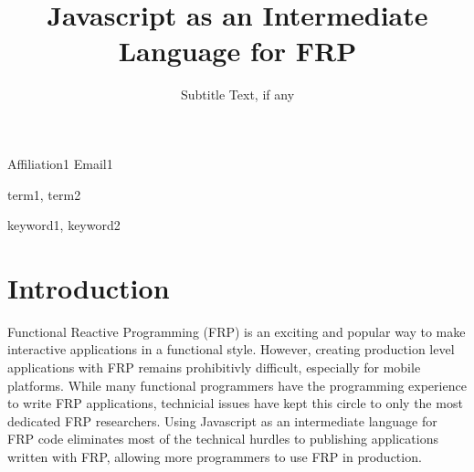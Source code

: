 \documentclass{sigplanconf}
\begin{document}
\setlength{\pdfpageheight}{\paperheight}
\setlength{\pdfpagewidth}{\paperwidth}






\title{Javascript as an Intermediate Language for FRP}
\subtitle{Subtitle Text, if any}

           {Affiliation1}
           {Email1}

\maketitle



\terms
term1, term2

\keywords
keyword1, keyword2

\section{Introduction}


Functional Reactive Programming (FRP) is an exciting and popular way to make interactive applications in a functional style.
However, creating production level applications with FRP remains prohibitivly difficult, especially for mobile platforms.
While many functional programmers have the programming experience to write FRP applications, technicial issues have kept this circle to only the most dedicated FRP researchers.
Using Javascript as an intermediate language for FRP code eliminates most of the technical hurdles to publishing applications written with FRP, allowing more programmers to use FRP in production.
\end{document}
